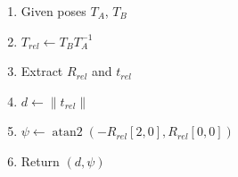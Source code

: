 \begin{enumerate}
    \item Given poses $T_A$, $T_B$
    \item $T_{rel} \gets T_B T_A^{-1}$
    \item Extract $R_{rel}$ and $t_{rel}$
    \item $d \gets \|t_{rel}\|$
    \item $\psi \gets \operatorname{atan2}(-R_{rel}[2,0], R_{rel}[0,0])$
    \item Return $(d, \psi)$
\end{enumerate}
